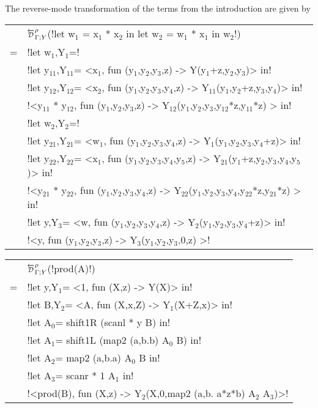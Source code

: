 \begin{example}
    The reverse-mode transformation of the terms from the introduction are given by

    \begin{tabular}{c l}
        &$\directD{\rho}{\Gamma}{Y}$(!let w$_1$ = x$_1$ * x$_2$ in let w$_2$ = w$_1$ * x$_1$ in w$_2$!) \\
        =& !let w$_1$,Y$_1$=!\\
        & \quad\quad !let y$_{11}$,Y$_{11}$= <x$_1$, fun (y$_1$,y$_2$,y$_3$,z) -> Y(y$_1$+z,y$_2$,y$_3$)> in! \\
        & \quad\quad !let y$_{12}$,Y$_{12}$= <x$_{2}$, fun (y$_{1}$,y$_{2}$,y$_{3}$,y$_{4}$,z) -> Y$_{11}$(y$_{1}$,y$_{2}$+z,y$_{3}$,y$_{4}$)> in! \\
        & \quad\quad !<y$_{11}$ * y$_{12}$, fun (y$_{1}$,y$_{2}$,y$_{3}$,z) -> Y$_{12}$(y$_{1}$,y$_{2}$,y$_{3}$,y$_{12}$*z,y$_{11}$*z) > in! \\
        & !let w$_{2}$,Y$_{2}$=!\\
        & \quad\quad !let y$_{21}$,Y$_{21}$= <w$_{1}$, fun (y$_{1}$,y$_{2}$,y$_{3}$,y$_{4}$,z) -> Y$_1$(y$_{1}$,y$_{2}$,y$_{3}$,y$_{4}$+z)> in! \\
        & \quad\quad !let y$_{22}$,Y$_{22}$= <x$_{1}$, fun (y$_{1}$,y$_{2}$,y$_{3}$,y$_{4}$,y$_{5}$,z) -> Y$_{21}$(y$_{1}$+z,y$_{2}$,y$_{3}$,y$_{4}$,y$_{5}$)> in! \\
        & \quad\quad !<y$_{21}$ * y$_{22}$, fun (y$_{1}$,y$_{2}$,y$_{3}$,y$_{4}$,z) -> Y$_{22}$(y$_{1}$,y$_{2}$,y$_{3}$,y$_{4}$,y$_{22}$*z,y$_{21}$*z) > in! \\
        & !let y,Y$_{3}$= <w, fun (y$_{1}$,y$_{2}$,y$_{3}$,y$_{4}$,z) -> Y$_{2}$(y$_{1}$,y$_{2}$,y$_{3}$,y$_{4}$+z)> in! \\
        & !<y, fun (y$_{1}$,y$_{2}$,y$_{3}$,z) -> Y$_{3}$(y$_{1}$,y$_{2}$,y$_{3}$,0,z) >!
    \end{tabular}
    \medskip

    \begin{tabular}{c l}
        &$\directD{\rho}{\Gamma}{Y}$(!prod(A)!) \\
        =& !let y,Y$_{1}$= <1, fun (X,z) -> Y(X)> in! \\
        & !let B,Y$_{2}$= <A, fun (X,x,Z) -> Y$_{1}$(X+Z,x)> in!\\
        & !let A$_{0}$= shift1R (scanl * y B) in!\\
        & !let A$_{1}$= shift1L (map2 (a,b.b) A$_{0}$ B) in!\\
        & !let A$_{2}$= map2 (a,b.a) A$_{0}$ B in!\\
        & !let A$_{3}$= scanr * 1 A$_{1}$ in!\\
        & !<prod(B), fun (X,z) -> Y$_{2}$(X,0,map2 (a,b. a*z*b) A$_{2}$ A$_{3}$)>! 
    \end{tabular}
\end{example}

